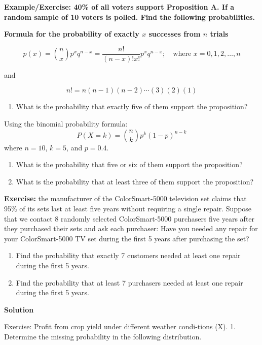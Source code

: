 \documentclass[
]{book}
\providecommand{\tightlist}{%
  \setlength{\itemsep}{0pt}\setlength{\parskip}{0pt}}
\begin{document}
\textbf{Example/Exercise: 40\% of all voters support Proposition A. If a random sample of 10 voters is polled. Find the following probabilities.}

\textbf{Formula for the probability of exactly \(x\) successes from \(n\) trials}

\[
p(x) = \binom{n}{x} p^x q^{n-x} = \frac{n!}{(n-x)!x!} p^x q^{n-x}; \quad \text{where } x = 0, 1, 2, \ldots, n
\]

and

\[
n! = n(n-1)(n-2) \cdots (3)(2)(1)
\]

\begin{enumerate}
\def\labelenumi{\arabic{enumi}.}
\tightlist
\item
  What is the probability that exactly five of them support the proposition?
\end{enumerate}

Using the binomial probability formula:
\[
   P(X = k) = \binom{n}{k} p^k (1-p)^{n-k}
   \]
where \(n = 10\), \(k = 5\), and \(p = 0.4\).

\begin{enumerate}
\def\labelenumi{\arabic{enumi}.}
\setcounter{enumi}{1}
\item
  What is the probability that five or six of them support the proposition?
\item
  What is the probability that at least three of them support the proposition?
\end{enumerate}

\textbf{Exercise:} the manufacturer of the ColorSmart-5000 television set claims that 95\% of
its sets last at least five years without requiring a single repair. Suppose that we contact 8 randomly selected ColorSmart-5000 purchasers five years after they purchased their sets
and ask each purchaser: Have you needed any repair for your ColorSmart-5000 TV set
during the first 5 years after purchasing the set?

\begin{enumerate}
\def\labelenumi{\arabic{enumi}.}
\item
  Find the probability that exactly 7 customers needed at least one repair during the first 5 years.
\item
  Find the probability that at least 7 purchasers needed at least one repair during the first 5 years.
\end{enumerate}

\textbf{Solution}

Exercise: Profit from crop yield under different weather condi-tions (X).
1. Determine the missing probability in the following distribution.
\end{document}
